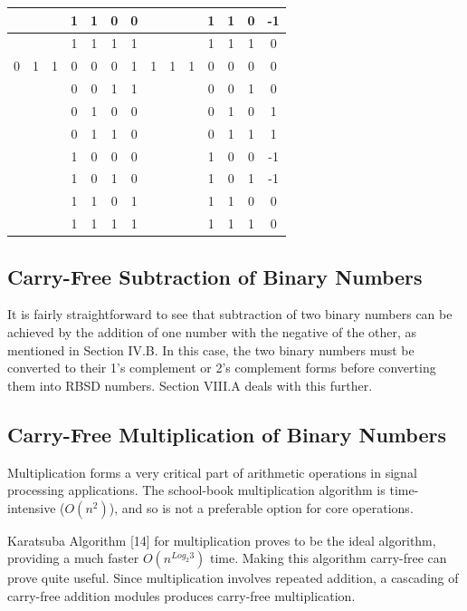 \documentclass[conference]{IEEEtran}
\begin{document}
\begin{table}[h!]
\begin{tabular}{|c|c|c|c|c|c||c|||c|c|c|c|c|c||c|}
    \hline
    & & & 1 & 1 & 0 & 0  &  & & & 1 & 1 & 0 & -1 \\
    \hline
    & & & 1 & 1 & 1 & 1  &  & & & 1 & 1 & 1 & 0 \\
    \hline
    0 & 1 & 1 & 0 & 0 & 0 & 1  &  1 & 1 & 1 & 0 & 0 & 0 & 0 \\
    \hline
    & & & 0 & 0 & 1 & 1  &  & & & 0 & 0 & 1 & 0 \\
    \hline
    & & & 0 & 1 & 0 & 0  &  & & & 0 & 1 & 0 & 1 \\
    \hline
    & & & 0 & 1 & 1 & 0  &  & & & 0 & 1 & 1 & 1 \\
    \hline
    & & & 1 & 0 & 0 & 0  &  & & & 1 & 0 & 0 & -1 \\
    \hline
    & & & 1 & 0 & 1 & 0  &  & & & 1 & 0 & 1 & -1 \\
    \hline
    & & & 1 & 1 & 0 & 1  &  & & & 1 & 1 & 0 & 0 \\
    \hline
    & & & 1 & 1 & 1 & 1  &  & & & 1 & 1 & 1 & 0 \\
    \hline
  \end{tabular}
\end{table}

\subsection{Carry-Free Subtraction of Binary Numbers}

It is fairly straightforward to see that subtraction of two binary numbers can be achieved by the addition of one number with the negative of the other, as mentioned in Section IV.B. In this case, the two binary numbers must be converted to their 1’s complement or 2’s complement forms before converting them into RBSD numbers. Section VIII.A deals with this further.

\subsection{Carry-Free Multiplication of Binary Numbers}

Multiplication forms a very critical part of arithmetic operations in signal processing applications. The school-book multiplication algorithm is time-intensive ($O(n^{2})$), and so is not a preferable option for core operations.

Karatsuba Algorithm [14] for multiplication proves to be the ideal algorithm, providing a much faster $O(n^{Log_{2}3})$ time. Making this algorithm carry-free can prove quite useful. Since multiplication involves repeated addition, a cascading of carry-free addition modules produces carry-free multiplication.
\end{document}
